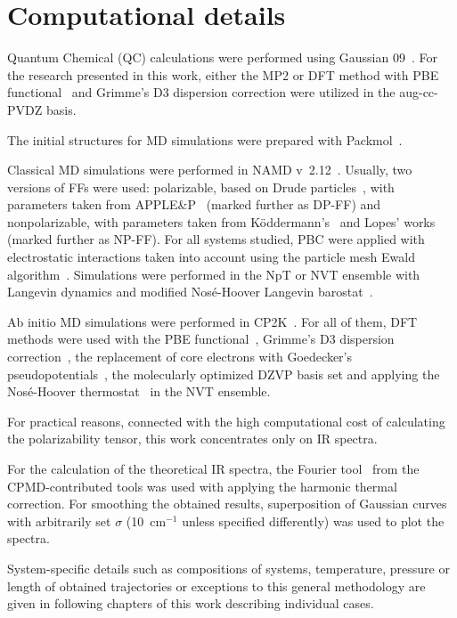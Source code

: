 \section{Computational details}

Quantum Chemical (QC) calculations were performed using Gaussian 09~\cite{gaussian}. For the research presented in this work, either the MP2 or DFT method with PBE functional~\cite{pbe-1,pbe-2,pbe-3,pbe-4} and Grimme's D3 dispersion correction were utilized in the aug-cc-PVDZ basis.

The initial structures for MD simulations were prepared with Packmol~\cite{packmol}.

Classical MD simulations were performed in NAMD v~2.12~\cite{namd}. Usually, two versions of FFs were used: polarizable, based on Drude particles~\cite{ff-drude}, with parameters taken from APPLE\&P~\cite{ff-applep} (marked further as DP-FF) and nonpolarizable, with parameters taken from K\"{o}ddermann's~\cite{ff-koddermann} and Lopes' works~\cite{ff-lopes-padua} (marked further as NP-FF). For all systems studied, PBC were applied with electrostatic interactions taken into account using the particle mesh Ewald algorithm~\cite{ewald-mesh}. Simulations were performed in the NpT or NVT ensemble with Langevin dynamics and modified Nos\'{e}-Hoover Langevin barostat~\cite{nose-hoover-langevin-1,nose-hoover-langevin-2}.

Ab initio MD simulations were performed in CP2K~\cite{cp2k}. For all of them, DFT methods were used with the PBE functional~\cite{pbe-1,pbe-2,pbe-3,pbe-4}, Grimme's D3 dispersion correction~\cite{grimme-d3}, the replacement of core electrons with Goedecker's pseudopotentials~\cite{goedecker-1,goedecker-2}, the molecularly optimized DZVP basis set and applying the Nos\'{e}-Hoover thermostat~\cite{nose-hoover-1,nose-hoover-2,nose-hoover-3,nose-hoover-4,nose-hoover-5,nose-hoover-6} in the NVT ensemble.

For practical reasons, connected with the high computational cost of calculating the polarizability tensor, this work concentrates only on IR spectra.

For the calculation of the theoretical IR spectra, the Fourier tool~\cite{cpmd-fourier} from the CPMD-contributed tools was used with applying the harmonic thermal correction. For smoothing the obtained results, superposition of Gaussian curves with arbitrarily set $\sigma$ (10~cm$^{-1}$ unless specified differently) was used to plot the spectra.

System-specific details such as compositions of systems, temperature, pressure or length of obtained trajectories or exceptions to this general methodology are given in following chapters of this work describing individual cases.
